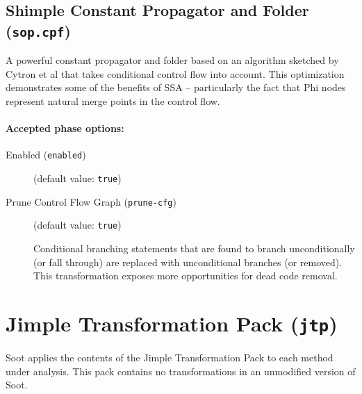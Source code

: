 \documentclass{article}
\begin{document}
\subsection{Shimple Constant Propagator and Folder ({\tt sop.cpf})}

            
\par

              A powerful constant propagator and folder based on an
              algorithm sketched by Cytron et al that takes
              conditional control flow into account.  This
              optimization demonstrates some of the benefits of SSA
              -- particularly the fact that Phi nodes represent
              natural merge points in the control flow.
            
          

\paragraph{Accepted phase options:} 

\begin{description}

\item[Enabled ({\tt enabled})]
(default value: {\tt true})






\item[Prune Control Flow Graph ({\tt prune-cfg})]
(default value: {\tt true})




              
\par

                Conditional branching statements that are found to
                branch unconditionally (or fall through) are replaced
                with unconditional branches (or removed).  This
                transformation exposes more opportunities for dead
                code removal.
              
            


\end{description}

\section{Jimple Transformation Pack ({\tt jtp})}

Soot applies the contents of the Jimple Transformation Pack to
each method under analysis.  This pack contains no
transformations in an unmodified version of Soot.
\end{document}
